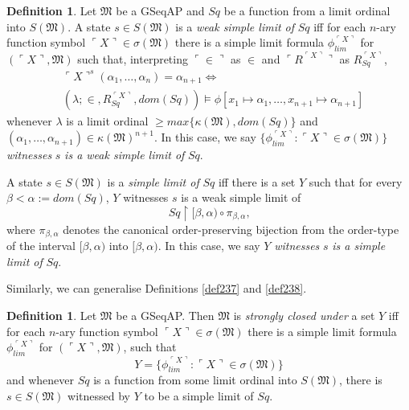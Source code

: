 \documentclass[12pt, twoside]{memoir}
\numberwithin{equation}{section}
\theoremstyle{definition}
\newtheorem{defi}[thm]{Definition}
\theoremstyle{remark}
\theoremstyle{definition}
\theoremstyle{definition}
\theoremstyle{definition}
\theoremstyle{remark}
\begin{document}
\begin{defi}\label{def256}
Let $\mathfrak{M}$ be a GSeqAP and $Sq$ be a function from a limit ordinal into $S(\mathfrak{M})$. A state $s \in S(\mathfrak{M})$ is a \emph{weak simple limit of} $Sq$ iff for each $n$-ary function symbol $\ulcorner X \urcorner \in \sigma(\mathfrak{M})$ there is a simple limit formula $\phi_{lim}^{\ulcorner X \urcorner}$ for $(\ulcorner X \urcorner, \mathfrak{M})$ such that, interpreting $\ulcorner \in \urcorner$ as $\in$ and $\ulcorner R^{\ulcorner X \urcorner} \urcorner$ as $R_{Sq}^{\ulcorner X \urcorner}$, 
\begin{align*}
    & \ulcorner X \urcorner^s (\alpha_1, \dots, \alpha_n) = \alpha_{n+1} \iff \\
    & (\lambda; \in, R_{Sq}^{\ulcorner X \urcorner}, dom(Sq)) \models \phi[x_1 \mapsto \alpha_1, \dots, x_{n+1} \mapsto \alpha_{n+1}]
\end{align*}
whenever $\lambda$ is a limit ordinal $\geq max\{\kappa(\mathfrak{M}), dom(Sq)\}$ and $(\alpha_1, \dots, \alpha_{n+1}) \in \kappa(\mathfrak{M})^{n+1}$. In this case, we say $\{\phi_{lim}^{\ulcorner X \urcorner} : \ulcorner X \urcorner \in \sigma(\mathfrak{M})\}$ \emph{witnesses} $s$ \emph{is a weak simple limit of} $Sq$.

A state $s \in S(\mathfrak{M})$ is a \emph{simple limit of} $Sq$ iff there is a set $Y$ such that for every $\beta < \alpha := dom(Sq)$, $Y$ witnesses $s$ is a weak simple limit of
\begin{equation*}
    Sq \restriction [\beta, \alpha) \circ \pi_{\beta, \alpha} \text{,}
\end{equation*}
where $\pi_{\beta, \alpha}$ denotes the canonical order-preserving bijection from the order-type of the interval $[\beta, \alpha)$ into $[\beta, \alpha)$. In this case, we say $Y$ \emph{witnesses} $s$ \emph{is a simple limit of} $Sq$.
\end{defi}

Similarly, we can generalise Definitions \ref{def237} and \ref{def238}.

\begin{defi}\label{def257p}
Let $\mathfrak{M}$ be a GSeqAP. Then $\mathfrak{M}$ is \emph{strongly closed under} a set $Y$ iff for each $n$-ary function symbol $\ulcorner X \urcorner \in \sigma(\mathfrak{M})$ there is a simple limit formula $\phi_{lim}^{\ulcorner X \urcorner}$ for $(\ulcorner X \urcorner, \mathfrak{M})$, such that 
\begin{equation*}
    Y = \{\phi_{lim}^{\ulcorner X \urcorner} : \ulcorner X \urcorner \in \sigma(\mathfrak{M})\}
\end{equation*}
and whenever $Sq$ is a function from some limit ordinal into $S(\mathfrak{M})$, there is $s \in S(\mathfrak{M})$ witnessed by $Y$ to be a simple limit of $Sq$.
\end{defi}
\end{document}
